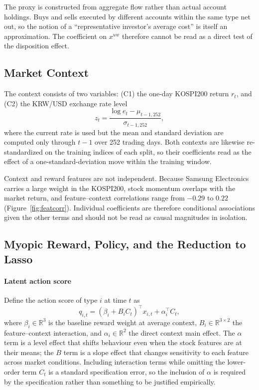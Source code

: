 The proxy is constructed from aggregate flow rather than actual account
holdings. Buys and sells executed by different accounts within the same type
net out, so the notion of a ``representative investor's average cost'' is itself
an approximation. The coefficient on $x^{uw}$ therefore cannot be read as a
direct test of the disposition effect.

\subsection{Market Context}
\label{sec:context}

The context consists of two variables: (C1) the one-day KOSPI200 return $r_t$,
and (C2) the KRW/USD exchange rate level
\begin{equation}
z_t=\frac{\log e_t-\mu_{t-1,252}}{\sigma_{t-1,252}},
\label{eq:fxcontext}
\end{equation}
where the current rate is used but the mean and standard deviation are computed
only through $t-1$ over 252 trading days. Both contexts are likewise
re-standardized on the training indices of each split, so their coefficients
read as the effect of a one-standard-deviation move within the training window.

Context and reward features are not independent. Because Samsung Electronics
carries a large weight in the KOSPI200, stock momentum overlaps with the market
return, and feature--context correlations range from $-0.29$ to $0.22$
(Figure~\ref{fig:featcorr}). Individual coefficients are therefore conditional
associations given the other terms and should not be read as causal magnitudes
in isolation.

\subsection{Myopic Reward, Policy, and the Reduction to Lasso}
\label{sec:model}

\paragraph{Latent action score}
Define the action score of type $i$ at time $t$ as
\begin{equation}
q_{i,t}=(\beta_i+B_iC_t)^{\top}x_{i,t}+\alpha_i^{\top}C_t,
\label{eq:score}
\end{equation}
where $\beta_i\in\mathbb{R}^{3}$ is the baseline reward weight at average
context, $B_i\in\mathbb{R}^{3\times 2}$ the feature--context interaction, and
$\alpha_i\in\mathbb{R}^{2}$ the direct context main effect. The $\alpha$ term is
a level effect that shifts behaviour even when the stock features are at their
means; the $B$ term is a slope effect that changes sensitivity to each feature
across market conditions. Including interaction terms while omitting the
lower-order term $C_t$ is a standard specification error, so the inclusion of
$\alpha$ is required by the specification rather than something to be justified
empirically.

